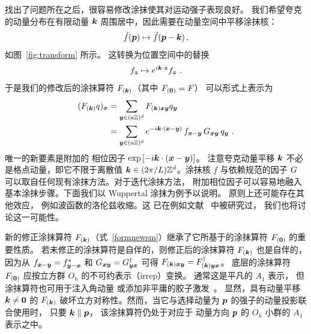 找出了问题所在之后，很容易修改涂抹使其对运动强子表现良好。
我们希望夸克的动量分布在有限动量 $\boldsymbol{k}$ 周围居中，因此需要在动量空间中平移涂抹核：
\begin{equation}
	\tilde{f}(\boldsymbol{p}) \mapsto  \tilde{f}(\boldsymbol{p} - \boldsymbol{k}) \label{kerfourshift}\,,
\end{equation}
如图~\ref{fig:transform} 所示。
这转换为位置空间中的替换
\begin{equation}
	f_{\boldsymbol{z}} \mapsto e^{i\boldsymbol{k}\cdot\boldsymbol{z}} f_{\boldsymbol{z}} \ .
\end{equation}
于是我们的修改后的涂抹算符 $F_{(\boldsymbol{k})}$（其中 $F_{(\boldsymbol{0})}=F$）
可以形式上表示为
\begin{align}
	(F_{(\boldsymbol{k})} q)_{\boldsymbol{x}} &= \sum_{\boldsymbol{y}\in (a \mathbb{Z})^d} F_{(\boldsymbol{k})\boldsymbol{x}\boldsymbol{y}} q_{\boldsymbol{y}}\nonumber\\&=
	\sum_{\boldsymbol{y}\in (a \mathbb{Z})^d} e^{-i\boldsymbol{k}\cdot(\boldsymbol{x}-\boldsymbol{y})}\, f_{\boldsymbol{x}-\boldsymbol{y}}\, G_{\boldsymbol{x}\boldsymbol{y}}\, q_{\boldsymbol{y}} \label{formnewsm}\ .
\end{align}
唯一的新要素是附加的
相位因子 $\exp\left[-i\boldsymbol{k}\cdot(\boldsymbol{x}-\boldsymbol{y})\right]$。
注意夸克动量平移
$\boldsymbol{k}$ 不必是格点动量，即它不限于离散值 $\boldsymbol{k}\in(2\pi/L)\mathbb{Z}^d$。涂抹核 $f$
与依赖规范的因子 $G$ 可以取自任何现有涂抹方法。对于迭代涂抹方法，
附加相位因子可以容易地融入基本涂抹步骤。下面我们以
Wuppertal 涂抹为例予以说明。
原则上还可能存在其他效应，
例如波函数的洛伦兹收缩。这
已在例如文献~\cite{Roberts:2012tp,DellaMorte:2012xc} 中被研究过，
我们也将讨论这一可能性。

新的修正涂抹算符 $F_{(\boldsymbol{k})}$（式~\eqref{formnewsm}）继承了它所基于的涂抹算符 $F_{(\boldsymbol{0})}$ 的重要性质。
若未修正的涂抹算符是自伴的，则修正后的涂抹算符 $F_{(\boldsymbol{k})}$ 也是自伴的，
因为从 $f_{\boldsymbol{x}-\boldsymbol{y}} = f_{\boldsymbol{y}-\boldsymbol{x}}^*$ 和 $G_{\boldsymbol{x}\boldsymbol{y}} = G^\dagger_{\boldsymbol{y}\boldsymbol{x}}$ 可得
$F_{(\boldsymbol{k})\boldsymbol{x}\boldsymbol{y}} = F^\dagger_{(\boldsymbol{k})\boldsymbol{y}\boldsymbol{x}}$。
底层的涂抹算符 $F_{(\boldsymbol{0})}$ 应按立方群 $O_h$ 的不可约表示（irrep）变换。
通常这是平凡的 $A_1$ 表示，
但涂抹算符也可用于注入角动量
或添加非平庸的胶子激发~\cite{Lacock:1994qx}。
显然，具有动量平移 $\boldsymbol{k}\neq\boldsymbol{0}$ 的 $F_{(\boldsymbol{k})}$
破坏立方对称性。然而，当它与选择动量为 $\boldsymbol{p}$ 的强子的动量投影联合使用时，
只要 $\boldsymbol{k}\parallel \boldsymbol{p}$，
该涂抹算符仍处于对应于
动量方向 $\boldsymbol{p}$ 的 $O_h$ 小群的
$A_1$ 表示之中。
